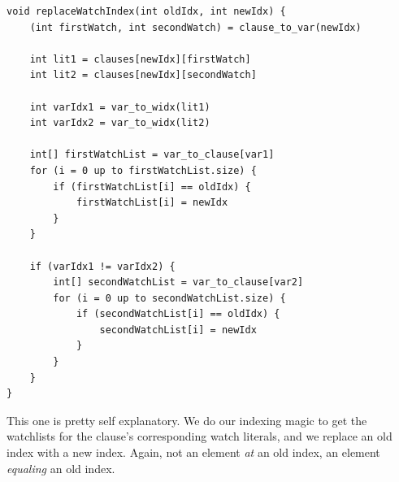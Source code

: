 \documentclass[oneside]{book}
\begin{document}
\begin{lstlisting}
void replaceWatchIndex(int oldIdx, int newIdx) {
    (int firstWatch, int secondWatch) = clause_to_var(newIdx)

    int lit1 = clauses[newIdx][firstWatch]
    int lit2 = clauses[newIdx][secondWatch]

    int varIdx1 = var_to_widx(lit1)
    int varIdx2 = var_to_widx(lit2)

    int[] firstWatchList = var_to_clause[var1]
    for (i = 0 up to firstWatchList.size) {
        if (firstWatchList[i] == oldIdx) {
            firstWatchList[i] = newIdx
        }
    }

    if (varIdx1 != varIdx2) {
        int[] secondWatchList = var_to_clause[var2]
        for (i = 0 up to secondWatchList.size) {
            if (secondWatchList[i] == oldIdx) {
                secondWatchList[i] = newIdx
            }
        }
    }
}
\end{lstlisting}
\noindent
This one is pretty self explanatory. We do our indexing magic to get the watchlists 
for the clause's corresponding watch literals, and we replace an old index with 
a new index. Again, not an element \textit{at} an old index, an element \textit{equaling}
an old index.
\end{document}
